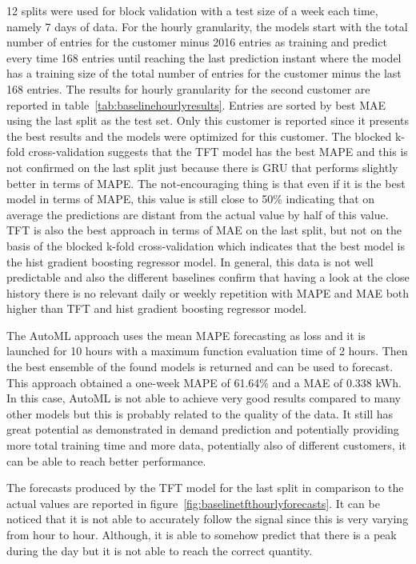 12 splits were used for block validation with a test size of a week each time, namely 7 days of data.
For the hourly granularity, the models start with the total number of entries for the customer minus 2016 entries as training and predict every time 168 entries until reaching the last prediction instant where the model has a training size of the total number of entries for the customer minus the last 168 entries.
The results for hourly granularity for the second customer are reported in table~\ref{tab:baselinehourlyresults}.
Entries are sorted by best MAE using the last split as the test set.
Only this customer is reported since it presents the best results and the models were optimized for this customer.
The blocked k-fold cross-validation suggests that the TFT model has the best MAPE and this is not confirmed on the last split just because there is GRU that performs slightly better in terms of MAPE.
The not-encouraging thing is that even if it is the best model in terms of MAPE, this value is still close to 50\% indicating that on average the predictions are distant from the actual value by half of this value.
TFT is also the best approach in terms of MAE on the last split, but not on the basis of the blocked k-fold cross-validation which indicates that the best model is the hist gradient boosting regressor model.
In general, this data is not well predictable and also the different baselines confirm that having a look at the close history there is no relevant daily or weekly repetition with MAPE and MAE both higher than TFT and hist gradient boosting regressor model.

The AutoML approach uses the mean MAPE forecasting as loss and it is launched for 10 hours with a maximum function evaluation time of 2 hours.
Then the best ensemble of the found models is returned and can be used to forecast.
This approach obtained a one-week MAPE of 61.64\% and a MAE of 0.338 kWh.
In this case, AutoML is not able to achieve very good results compared to many other models but this is probably related to the quality of the data.
It still has great potential as demonstrated in demand prediction and potentially providing more total training time and more data, potentially also of different customers, it can be able to reach better performance.

The forecasts produced by the TFT model for the last split in comparison to the actual values are reported in figure~\ref{fig:baselinetfthourlyforecasts}.
It can be noticed that it is not able to accurately follow the signal since this is very varying from hour to hour.
Although, it is able to somehow predict that there is a peak during the day but it is not able to reach the correct quantity.

